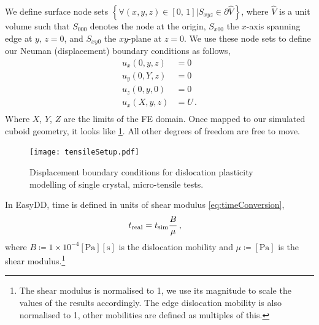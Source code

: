 We define surface node sets $\left\{\forall (x, y, z) \in [0,\, 1] \vert S_{xyz} \in \partial \hat{V}\right\}$, where $\hat{V}$ is a unit volume such that $S_{000}$ denotes the node at the origin, $S_{x00}$ the $x$-axis spanning edge at $y,\, z=0$, and $S_{xy0}$ the $xy$-plane at $z=0$. We use these node sets to define our Neuman (displacement) boundary conditions as follows,
\begin{subequations}
    \begin{align}
        u_x(0, y, z) & = 0    \\
        u_y(0, Y, z) & = 0    \\
        u_z(0, y, 0) & = 0    \\
        u_x(X, y, z) & = U\,. \\
    \end{align}
\end{subequations}
Where $X$, $Y$, $Z$ are the limits of the FE domain. Once mapped to our simulated cuboid geometry, it looks like \cref{f:tensileSetup}. All other degrees of freedom are free to move.
\begin{figure}
    \centering
    \texttt{[image: tensileSetup.pdf]}
    \caption[Displacement boundary conditions for dislocation plasticity modelling of single crystal, micro-tensile tests.]{Displacement boundary conditions for dislocation plasticity modelling of single crystal, micro-tensile tests.}
    \label{f:tensileSetup}
\end{figure}

In EasyDD, time is defined in units of shear modulus \cref{eq:timeConversion},
\begin{align}\label{eq:timeConversion}
    t_{\textrm{real}} & = t_{\textrm{sim}} \dfrac{B}{\mu}\,,
\end{align}
where $B \coloneqq 1 \times 10^{-4}[\si{\pascal}][\si{\second}]$ is the dislocation mobility and $\mu \coloneqq [\si{\pascal}]$ is the shear modulus.\footnote{The shear modulus is normalised to 1, we use its magnitude to scale the values of the results accordingly. The edge dislocation mobility is also normalised to 1, other mobilities are defined as multiples of this.}

